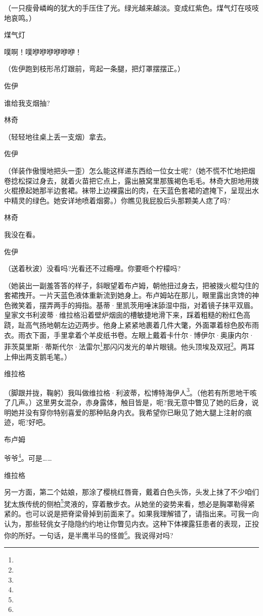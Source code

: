 \par （一只瘦骨嶙峋的犹大的手压住了光。绿光越来越淡。变成红紫色。煤气灯在吱吱地哀鸣。）
\par 煤气灯
\par 噗啊！噗咿咿咿咿咿咿！
\par （佐伊跑到枝形吊灯跟前，弯起一条腿，把灯罩摆摆正。）
\par 佐伊
\par 谁给我支烟抽?
\par 林奇
\par （轻轻地往桌上丢一支烟）拿去。
\par 佐伊
\par （佯装作傲慢地把头一歪）怎么能这样递东西给一位女士呢?（她不慌不忙地把烟卷捻松探过身去，就着火苗把它点上，露出腋窝里那簇褐色毛毛。林奇大胆地用拨火棍撩起她那半边套裙。袜带上边裸露出的肉，在天蓝色套裙的遮掩下，呈现出水中精灵的绿色。她安详地喷着烟雾。）你瞧见我屁股后头那颗美人痣了吗?
\par 林奇
\par 我没在看。
\par 佐伊
\par （送着秋波）没看吗?光看还不过瘾哩。你要咂个柠檬吗?
\par （她装出一副羞答答的样子，斜眼望着布卢姆，朝他扭过身去，把被拨火棍勾住的套裙拽开。一片天蓝色液体重新流到她身上。布卢姆站在那儿，眼里露出贪馋的神色微笑着，摆弄两手的拇指。基蒂·里凯茨用唾沫舔湿中指，对着镜子抹平双眉。皇家文书利波蒂·维拉格沿着壁炉烟囱的槽敏捷地滑下来，踩着粗糙的粉红色高跷，趾高气扬地朝左边迈两步。他身上紧紧地裹着几件大氅，外面罩着棕色胶布雨衣。雨衣下面，手里拿着个羊皮纸书卷。左眼上戴着卡什尔·博伊尔·奥康内尔·菲茨莫里斯·蒂斯代尔·法雷尔\footnote{}那闪闪发光的单片眼镜。他头顶埃及双冠\footnote{}。两耳上伸出两支鹅毛笔。）
\par 维拉格
\par （脚跟并拢，鞠躬）我叫做维拉格·利波蒂，松博特海伊人\footnote{}。（他若有所思地干咳了几声。）这里男女混杂，赤身露体，触目皆是，呃?我无意中瞥见了她的后身，说明她并没有穿你特别喜爱的那种贴身内衣。我希望你已瞅见了她大腿上注射的痕迹，呃?好吧。
\par 布卢姆
\par 爷爷\footnote{}。可是……
\par 维拉格
\par 另一方面，第二个姑娘，那涂了樱桃红唇膏，戴着白色头饰，头发上抹了不少咱们犹太族传统的侧柏\footnote{}灵液的，穿着散步衣。从她坐的姿势来看，想必是胸罩勒得紧紧的。也可以说是把脊梁骨掉到前面来了。如果我理解错了，请指出来。可我一向认为，那些轻佻女子隐隐约约地让你瞥见内衣。这种下体裸露狂患者的表现，正投你的所好。一句话，是半鹰半马的怪兽\footnote{}。我说得对吗?
